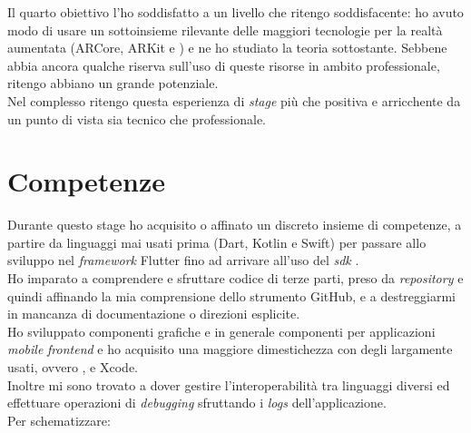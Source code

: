 Il quarto obiettivo l'ho soddisfatto a un livello che ritengo soddisfacente: ho avuto modo di usare un sottoinsieme rilevante delle maggiori tecnologie per la realtà aumentata (ARCore, ARKit e \asa{}) e ne ho studiato la teoria sottostante. Sebbene abbia ancora qualche riserva sull'uso di queste risorse in ambito professionale, ritengo abbiano un grande potenziale.\\
Nel complesso ritengo questa esperienza di \textit{stage} più che positiva e arricchente da un punto di vista sia tecnico che professionale.

\section{Competenze}
Durante questo stage ho acquisito o affinato un discreto insieme di competenze, a partire da linguaggi mai usati prima (Dart, Kotlin e Swift) per passare allo sviluppo nel \textit{framework} Flutter fino ad arrivare all'uso del \textit{sdk} \asa{}.\\
Ho imparato a comprendere e sfruttare codice di terze parti, preso da \textit{repository} e quindi affinando la mia comprensione dello strumento GitHub, e a destreggiarmi in mancanza di documentazione o direzioni esplicite.\\
Ho sviluppato componenti grafiche e in generale componenti per applicazioni \textit{mobile} \textit{frontend} e ho acquisito una maggiore dimestichezza con degli \ide{} largamente usati, ovvero \vsc{}, \astudio{} e Xcode.\\
Inoltre mi sono trovato a dover gestire l'interoperabilità tra linguaggi diversi ed effettuare operazioni di \textit{debugging} sfruttando i \textit{logs} dell'applicazione.\\
Per schematizzare:

